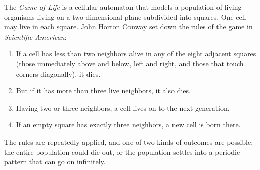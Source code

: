 \documentclass[12pt]{article}
\begin{document}
The {\em Game of Life} is a cellular automaton that models a population of living organisms living on a two-dimensional plane subdivided into squares. One cell may live in each square. John Horton Conway set down the rules of the game in {\it Scientific American}:

\begin{enumerate}
\item If a cell has less than two neighbors alive in any of the eight adjacent squares (those immediately above and below, left and right, and those that touch corners diagonally), it dies.
\item But if it has more than three live neighbors, it also dies.
\item Having two or three neighbors, a cell lives on to the next generation.
\item If an empty square has exactly three neighbors, a new cell is born there.
\end{enumerate}

The rules are repeatedly applied, and one of two kinds of outcomes are possible: the entire population could die out, or the population settles into a periodic pattern that can go on infinitely.
\end{document}

